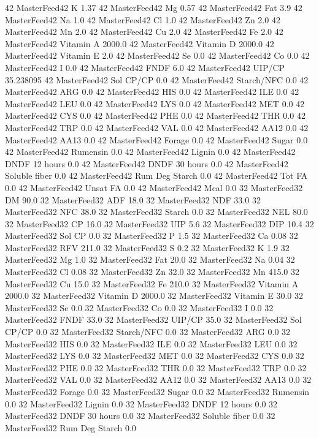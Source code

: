 \documentclass[letterpaper,10pt,english]{sphinxmanual}
\begin{document}
\begin{sphinxVerbatim}[commandchars=\\\{\},numbers=left,firstnumber=1,stepnumber=1]
42 MasterFeed42 K 1.37
42 MasterFeed42 Mg 0.57
42 MasterFeed42 Fat 3.9
42 MasterFeed42 Na 1.0
42 MasterFeed42 Cl 1.0
42 MasterFeed42 Zn 2.0
42 MasterFeed42 Mn 2.0
42 MasterFeed42 Cu 2.0
42 MasterFeed42 Fe 2.0
42 MasterFeed42 Vitamin A 2000.0
42 MasterFeed42 Vitamin D 2000.0
42 MasterFeed42 Vitamin E 2.0
42 MasterFeed42 Se 0.0
42 MasterFeed42 Co 0.0
42 MasterFeed42 I 0.0
42 MasterFeed42 FNDF 6.0
42 MasterFeed42 UIP/CP 35.238095
42 MasterFeed42 Sol CP/CP 0.0
42 MasterFeed42 Starch/NFC 0.0
42 MasterFeed42 ARG 0.0
42 MasterFeed42 HIS 0.0
42 MasterFeed42 ILE 0.0
42 MasterFeed42 LEU 0.0
42 MasterFeed42 LYS 0.0
42 MasterFeed42 MET 0.0
42 MasterFeed42 CYS 0.0
42 MasterFeed42 PHE 0.0
42 MasterFeed42 THR 0.0
42 MasterFeed42 TRP 0.0
42 MasterFeed42 VAL 0.0
42 MasterFeed42 AA\PYGZsh{}12 0.0
42 MasterFeed42 AA\PYGZsh{}13 0.0
42 MasterFeed42 \PYGZpc{} Forage 0.0
42 MasterFeed42 Sugar \PYGZpc{} 0.0
42 MasterFeed42 Rumensin 0.0
42 MasterFeed42 Lignin 0.0
42 MasterFeed42 DNDF 12 hours 0.0
42 MasterFeed42 DNDF 30 hours 0.0
42 MasterFeed42 Soluble fiber 0.0
42 MasterFeed42 Rum Deg Starch 0.0
42 MasterFeed42 Tot FA 0.0
42 MasterFeed42 Unsat FA 0.0
42 MasterFeed42 Mcal 0.0
32 MasterFeed32 DM 90.0
32 MasterFeed32 ADF 18.0
32 MasterFeed32 NDF 33.0
32 MasterFeed32 NFC 38.0
32 MasterFeed32 Starch 0.0
32 MasterFeed32 NEL 80.0
32 MasterFeed32 CP 16.0
32 MasterFeed32 UIP 5.6
32 MasterFeed32 DIP 10.4
32 MasterFeed32 Sol CP 0.0
32 MasterFeed32 P 1.5
32 MasterFeed32 Ca 0.08
32 MasterFeed32 RFV 211.0
32 MasterFeed32 S 0.2
32 MasterFeed32 K 1.9
32 MasterFeed32 Mg 1.0
32 MasterFeed32 Fat 20.0
32 MasterFeed32 Na 0.04
32 MasterFeed32 Cl 0.08
32 MasterFeed32 Zn 32.0
32 MasterFeed32 Mn 415.0
32 MasterFeed32 Cu 15.0
32 MasterFeed32 Fe 210.0
32 MasterFeed32 Vitamin A 2000.0
32 MasterFeed32 Vitamin D 2000.0
32 MasterFeed32 Vitamin E 30.0
32 MasterFeed32 Se 0.0
32 MasterFeed32 Co 0.0
32 MasterFeed32 I 0.0
32 MasterFeed32 FNDF 33.0
32 MasterFeed32 UIP/CP 35.0
32 MasterFeed32 Sol CP/CP 0.0
32 MasterFeed32 Starch/NFC 0.0
32 MasterFeed32 ARG 0.0
32 MasterFeed32 HIS 0.0
32 MasterFeed32 ILE 0.0
32 MasterFeed32 LEU 0.0
32 MasterFeed32 LYS 0.0
32 MasterFeed32 MET 0.0
32 MasterFeed32 CYS 0.0
32 MasterFeed32 PHE 0.0
32 MasterFeed32 THR 0.0
32 MasterFeed32 TRP 0.0
32 MasterFeed32 VAL 0.0
32 MasterFeed32 AA\PYGZsh{}12 0.0
32 MasterFeed32 AA\PYGZsh{}13 0.0
32 MasterFeed32 \PYGZpc{} Forage 0.0
32 MasterFeed32 Sugar \PYGZpc{} 0.0
32 MasterFeed32 Rumensin 0.0
32 MasterFeed32 Lignin 0.0
32 MasterFeed32 DNDF 12 hours 0.0
32 MasterFeed32 DNDF 30 hours 0.0
32 MasterFeed32 Soluble fiber 0.0
32 MasterFeed32 Rum Deg Starch 0.0

\end{sphinxVerbatim}
\end{document}
